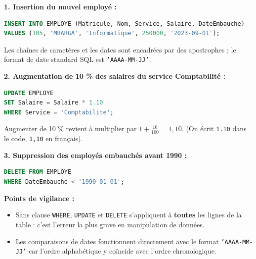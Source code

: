 \documentclass[11pt]{article}
\begin{document}
\begin{corrige}
\textbf{1. Insertion du nouvel employé :}
\begin{lstlisting}[language=SQL]
INSERT INTO EMPLOYE (Matricule, Nom, Service, Salaire, DateEmbauche)
VALUES (105, 'MBARGA', 'Informatique', 250000, '2023-09-01');
\end{lstlisting}
Les chaînes de caractères et les dates sont encadrées par des apostrophes ; le format de date standard SQL est \texttt{'AAAA-MM-JJ'}.

\textbf{2. Augmentation de 10 \% des salaires du service Comptabilité :}
\begin{lstlisting}[language=SQL]
UPDATE EMPLOYE
SET Salaire = Salaire * 1.10
WHERE Service = 'Comptabilite';
\end{lstlisting}
Augmenter de 10 \% revient à multiplier par $1 + \frac{10}{100} = 1,10$. (On écrit \texttt{1.10} dans le code, \texttt{1,10} en français).

\textbf{3. Suppression des employés embauchés avant 1990 :}
\begin{lstlisting}[language=SQL]
DELETE FROM EMPLOYE
WHERE DateEmbauche < '1990-01-01';
\end{lstlisting}

\textbf{Points de vigilance :}
\begin{itemize}
    \item Sans clause \texttt{WHERE}, \texttt{UPDATE} et \texttt{DELETE} s'appliquent à \textbf{toutes} les lignes de la table : c'est l'erreur la plus grave en manipulation de données.
    \item Les comparaisons de dates fonctionnent directement avec le format \texttt{'AAAA-MM-JJ'} car l'ordre alphabétique y coïncide avec l'ordre chronologique.
\end{itemize}
\end{corrige}
\end{document}
